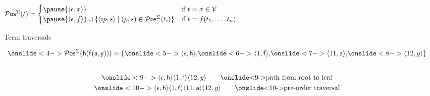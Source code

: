 

\begin{definition}
$
	\Pos^\Sigma(t) =  
	\begin{cases}
\pause		\{ \ANGLES{\epsilon,x} \} & \text{if }t=x\in\SIGV \\
\pause		\{ \ANGLES{\epsilon, f} \} \cup \{ \ANGLES{ip,s}\mid (p,s) \in\Pos^\Sigma(t_i)\} &
		\text{if }t=f(t_1,\ldots,t_n)
	\end{cases}
$
\end{definition}

%
\pause
\begin{block}{Term traversals}

\begin{minipage}[c]{3cm}
\end{minipage}
%
\begin{minipage}[c]{8.5cm}
	\begin{gather*}
		\onslide<4->{
			\Pos^\Sigma(\mh(\mf(\ma,\my))) = \{ 
		\onslide<5->{ \ANGLES{\epsilon,\mh}, 
			}}
		\onslide<6->{ \ANGLES{1,\mf}, }
		\onslide<7->{ \ANGLES{11,\ma}, }
		\onslide<8->{ \ANGLES{12,y} }
		\} \\[2em]
		\onslide<9->{\ANGLES{\epsilon,\mh}\ANGLES{1,\mf}\ANGLES{12,y}
			\tag*{\onslide<9->{path from root to leaf}} 
		}			\\
		\onslide<10->{\ANGLES{\epsilon,\mh}\ANGLES{1,\mf}\ANGLES{11,\ma}\ANGLES{12,y}
			\tag*{\onslide<10->{pre-order traversal}} 
		}
		\\
		\\
		\\
	\end{gather*}
\end{minipage}
\end{block}
